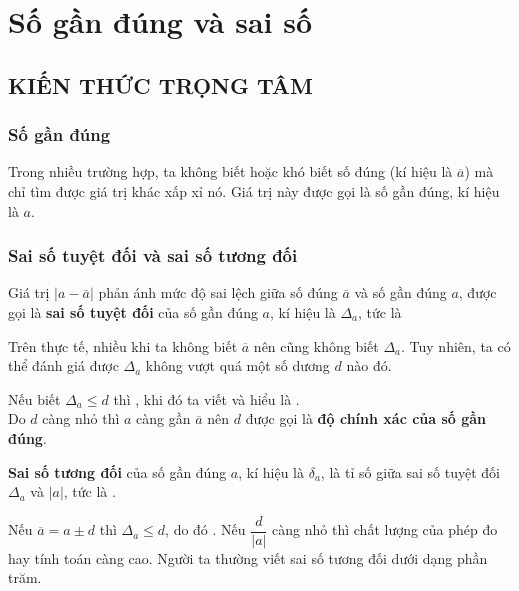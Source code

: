 \setcounter{dang}{0}
\section{Số gần đúng và sai số}
\subsection{KIẾN THỨC TRỌNG TÂM}
\subsubsection{Số gần đúng}
Trong nhiều trường hợp, ta không biết hoặc khó biết số đúng (kí hiệu là $\overline{a}$) mà chỉ tìm được giá trị khác xấp xỉ nó. Giá trị này được gọi là số gần đúng, kí hiệu là $a$.
\subsubsection{Sai số tuyệt đối và sai số tương đối}
\begin{boxdn}
	Giá trị $|a-\overline{a}|$ phản ánh mức độ sai lệch giữa số đúng $\overline{a}$ và số gần đúng $a$, được gọi là \textbf{sai số tuyệt đối} của số gần đúng $a$, kí hiệu là $\Delta_a$, tức là 
\end{boxdn}
\begin{note}
 Trên thực tế, nhiều khi ta không biết $\overline{a}$ nên cũng không biết $\Delta_a$. Tuy nhiên, ta có thể đánh giá được $\Delta_a$ không vượt quá một số dương $d$ nào đó.
\end{note}
\begin{boxdn}
Nếu biết $\Delta_a \leq d$ thì , khi đó ta viết  và hiểu là .\\
Do $d$ càng nhỏ thì $a$ càng gần $\overline{a}$ nên $d$ được gọi là \textbf{độ chính xác của số gần đúng}.
\end{boxdn}
\begin{boxdn}
	\textbf{Sai số tương đối} của số gần đúng $a$, kí hiệu là $\delta_a$, là tỉ số giữa sai số tuyệt đối $\Delta_a$ và $|a|$, tức là .
\end{boxdn}
\begin{nx}
	Nếu $\overline{a}=a\pm d$ thì $\Delta_a \leq d$, do đó . Nếu $\dfrac{d}{|a|}$ càng nhỏ thì chất lượng của phép đo hay tính toán càng cao. Người ta thường viết sai số tương đối dưới dạng phần trăm.
\end{nx}
